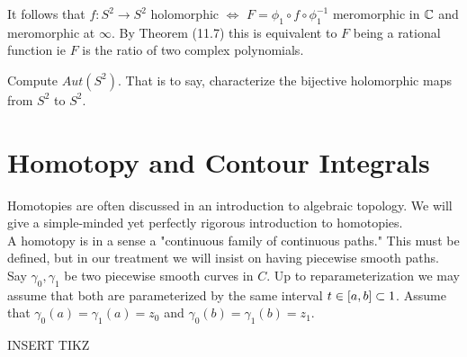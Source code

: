 



































\begin{remark}
It follows that $f: S^2 \to S^2$ holomorphic $\iff$ $F=\phi_1 \circ f \circ \phi_1^{-1}$ meromorphic in $\mathbb{C}$ and meromorphic at $\infty$. By Theorem (11.7) this is equivalent to $F$ being a rational function ie $F$ is the ratio of two complex polynomials.
\end{remark}

\begin{exercise}
Compute $Aut(S^2)$. That is to say, characterize the bijective holomorphic maps from $S^2 $ to $S^2$.
\end{exercise}



\section{Homotopy and Contour Integrals}

Homotopies are often discussed in an introduction to algebraic topology. We will give a simple-minded yet perfectly rigorous introduction to homotopies.\\

A homotopy is in a sense a "continuous family of continuous paths." This must be defined, but in our treatment we will insist on having piecewise smooth paths.\\


Say $\gamma_0, \gamma_1$ be two piecewise smooth curves in $
C$. Up to reparameterization we may assume that both are parameterized by the same interval $t \in [a,b] \subset 1$. Assume that $\gamma_0(a) = \gamma_1(a) = z_0$ and $\gamma_0(b) = \gamma_1(b) = z_1$.

INSERT TIKZ

